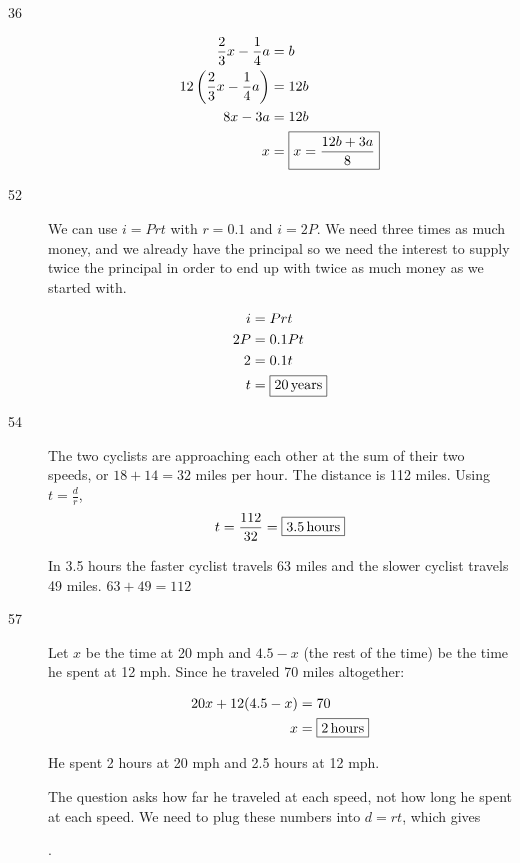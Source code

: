 \documentclass[letterpaper]{exam}
\begin{document}
\begin{description}
      \item[36]
        \begin{align*}
          \frac{2}{3}x - \frac{1}{4}a            & = b \\
          12 \del{ \frac{2}{3}x - \frac{1}{4}a } & = 12 b \\
          8x - 3a                                & = 12b \\
          x                                      & = \boxed{ x = \frac{12b + 3a}{8} } \\
        \end{align*}

      \newpage{}

      \item[52] 
        We can use $i = Prt$ with $r = 0.1$ and $i = 2P$.  We need three times as much money, and we
        already have the principal so we need the interest to supply twice the principal in order to
        end up with twice as much money as we started with.

        \begin{align*}
          i  & = Prt \\
          2P & = 0.1 P t \\
          2  & = 0.1  t \\
          t  & = \boxed{ \unit[20]{years} } \\
        \end{align*}

      \item[54] 
        The two cyclists are approaching each other at the sum of their two speeds, or 
        $18 + 14 = 32$ miles per hour.  The distance is 112 miles.  Using $t = \frac{d}{r}$, 
        \[
          t = \frac{112}{32} = \boxed{ \unit[3.5]{hours} }
        \]

        In 3.5 hours the faster cyclist travels 63 miles and the slower cyclist travels 49 miles.  
        $63 + 49 = 112$

      \newpage

      \item[57] Let $x$ be the time at 20 mph and $4.5 - x$ (the rest of the time) be the time he
        spent at 12 mph.  Since he traveled 70 miles altogether:

        \begin{align*}
          20x + 12(4.5 - x) & = 70 \\
          x                 & = \boxed{ \unit[2]{hours} } \\
        \end{align*}

      He spent 2 hours at 20 mph and 2.5 hours at 12 mph.  

      The question asks how far he traveled at each speed, not how long he spent at each speed.  We
      need to plug these numbers into $d = rt$, which gives 
      
      .  

  \end{description}
  \fi
\end{document}
